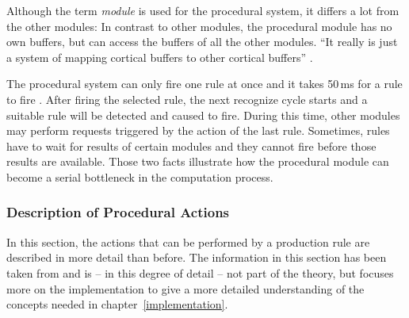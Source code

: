Although the term \emph{module} is used for the procedural system, it differs a lot from the other modules: In contrast to other modules, the procedural module has no own buffers, but can access the buffers of all the other modules. ``It really is just a system of mapping cortical buffers to other cortical buffers'' \cite[p. 54]{anderson_how_2007}.

The procedural system can only fire one rule at once and it takes 50\,ms for a rule to fire \cite[p. 54]{anderson_how_2007}. After firing the selected rule, the next recognize cycle starts and a suitable rule will be detected and caused to fire. During this time, other modules may perform requests triggered by the action of the last rule. Sometimes, rules have to wait for results of certain modules and they cannot fire before those results are available. Those two facts illustrate how the procedural module can become a serial bottleneck in the computation process.

\subsubsection{Description of Procedural Actions}
\label{description_of_proc_actions}

In this section, the actions that can be performed by a production rule are described in more detail than before. The information in this section has been taken from \cite[168\psqq]{actr_reference} and is -- in this degree of detail -- not part of the theory, but focuses more on the implementation to give a more detailed understanding of the concepts needed in chapter~\ref{implementation}.

